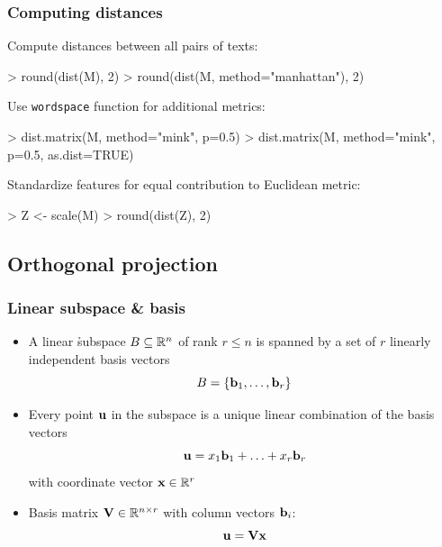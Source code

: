 \documentclass[t]{beamer} %
\begin{document}
\begin{frame}[fragile]
  \frametitle{Computing distances}

Compute distances between all pairs of texts:
\begin{Rcode}
> round(dist(M), 2)  
> round(dist(M, method="manhattan"), 2) 
\end{Rcode}

\gap[1]\pause
Use \texttt{wordspace} function for additional metrics:
\begin{Rcode}
> dist.matrix(M, method="mink", p=0.5)  
> dist.matrix(M, method="mink", p=0.5, as.dist=TRUE)
\end{Rcode}

\gap[1]\pause
Standardize features for equal contribution to Euclidean metric:
\begin{Rcode}
> Z <- scale(M)     
> round(dist(Z), 2) 
\end{Rcode}
\end{frame}

\subsection{Orthogonal projection}

\begin{frame}
  \frametitle{Linear subspace \& basis}
  
  \begin{itemize}
  \item A linear \h{subspace} $B\subseteq \mathbb{R}^n$ of rank $r\leq n$ is spanned by a set of $r$ linearly independent basis vectors
    \[
    B = \set{\vb_1, \ldots, \vb_r}
    \]
  \item<2-> Every point $\vu$ in the subspace is a unique linear combination of the basis vectors
    \[
    \vu = x_1 \vb_1 + \ldots + x_r \vb_r
    \]
    with coordinate vector $\vx\in \setR^r$
  \item<3-> Basis matrix $\mathbf{V} \in \mathbb{R}^{n\times r}$ with column vectors $\vb_i$:
    \[
    \vu = \mathbf{V} \vx 
    \]
  \end{itemize}
\end{frame}
\end{document}

